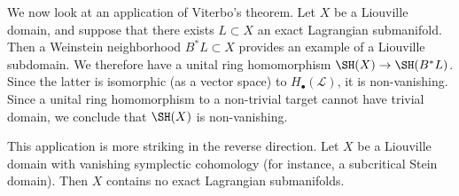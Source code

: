 
\begin{application}
 \label{app:viterboVanishing}
    We now look at an application of Viterbo's theorem.
    Let $X$ be a Liouville domain, and suppose that there exists $L\subset X$ an exact Lagrangian submanifold. Then a Weinstein neighborhood $B^*L\subset X$ provides an example of a Liouville subdomain. We therefore have a unital ring homomorphism $\SH(X)\to \SH(B^*L)$. Since the latter is isomorphic (as a vector space) to $H_\bullet(\mathcal L)$, it is non-vanishing. Since a unital ring homomorphism to a non-trivial target cannot have trivial domain, we conclude that $\SH(X)$ is non-vanishing.

    This application is more striking in the reverse direction. Let $X$ be a Liouville domain with vanishing symplectic cohomology (for instance, a subcritical Stein domain). Then $X$ contains no exact Lagrangian submanifolds.   
\end{application}